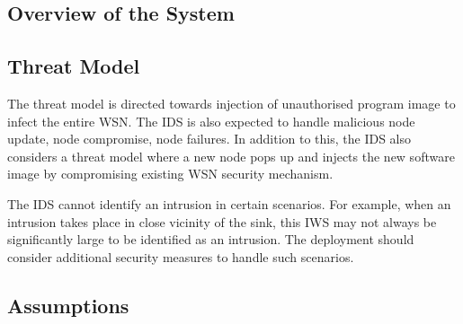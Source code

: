 \documentclass[conference,final]{IEEEtran}
\begin{document}
\subsection{Overview of the System}
\label{sec:des}


\subsection{Threat Model}


The threat model is directed towards injection of unauthorised program image to infect the entire WSN.
The IDS is also expected to handle malicious node update, node compromise, node failures.
In addition to this, the IDS also considers a threat model where a new node pops up and injects the new software image by compromising existing WSN security mechanism.


The IDS cannot identify an intrusion in certain scenarios.
For example, when an intrusion takes place in close vicinity of the sink, this IWS may not always be significantly large to be identified as an intrusion. 
The deployment should consider additional security measures to handle such scenarios.


\subsection{Assumptions} %
\label{sc:assump}
\end{document}
